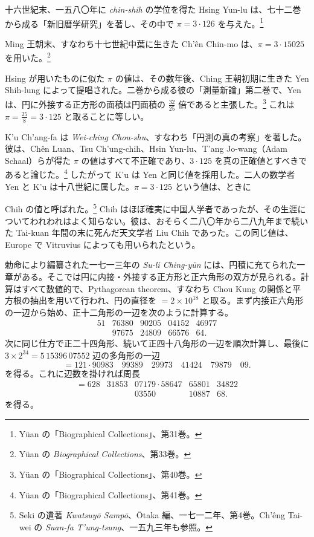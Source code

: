 \documentclass[11pt]{article}
\newcommand{\scanpage}[2]{\clearpage\setcounter{footnote}{0}\noindent{\footnotesize\color{gray}PDF #1 頁 · #2}\par\medskip}
\newcommand{\scanfooter}{}
\begin{document}
十六世紀末、一五八〇年に \emph{chin-shih} の学位を得た Hsing Yun-lu は、七十二巻から成る「新旧暦学研究」を著し、その中で $\pi=3\cdot126$ を与えた。\footnote{Yüan の「Biographical Collections」、第31巻。}

Ming 王朝末、すなわち十七世紀中葉に生きた Ch'ên Chin-mo は、$\pi=3\cdot15025$ を用いた。\footnote{Yüan の \emph{Biographical Collections}、第33巻。}

Hsing が用いたものに似た $\pi$ の値は、その数年後、Ching 王朝初期に生きた Yen Shih-lung によって提唱された。二巻から成る彼の「測量新論」第二巻で、Yen は、円に外接する正方形の面積は円面積の $\frac{32}{25}$ 倍であると主張した。\footnote{Yüan の「Biographical Collections」、第40巻。} これは $\pi=\frac{25}{8}=3\cdot125$ と取ることに等しい。

K'u Ch'ang-fa は \emph{Wei-ching Chou-shu}、すなわち「円測の真の考察」を著した。彼は、Chên Luan、Tsu Ch'ung-chih、Hsin Yun-lu、T'ang Jo-wang（Adam Schaal）らが得た $\pi$ の値はすべて不正確であり、$3\cdot125$ を真の正確値とすべきであると論じた。\footnote{Yüan の「Biographical Collections」、第41巻。} したがって K'u は Yen と同じ値を採用した。二人の数学者 Yen と K'u は十八世紀に属した。$\pi=3\cdot125$ という値は、ときに
\scanfooter

\scanpage{0153}{第20章、印刷頁139}
Chih の値と呼ばれた。\footnote{Seki の遺著 \emph{Kwatsuyō Sampō}、Ōtaka 編、一七一二年、第4巻。Ch'êng Tai-wei の \emph{Suan-fa T'ung-tsung}、一五九三年も参照。} Chih はほぼ確実に中国人学者であったが、その生涯についてわれわれはよく知らない。彼は、おそらく二八〇年から二八九年まで続いた Tai-kuan 年間の末に死んだ天文学者 Liu Chih であった。この同じ値は、Europe で Vitruvius によっても用いられたという。

勅命により編纂された一七一三年の \emph{Su-li Ching-yün} には、円積に充てられた一章がある。そこでは円に内接・外接する正方形と正六角形の双方が見られる。計算はすべて数値的で、Pythagorean theorem、すなわち Chou Kung の関係と平方根の抽出を用いて行われ、円の直径を $=2\times10^{18}$ と取る。まず内接正六角形の一辺から始め、正十二角形の一辺を次のように計算する。
\[
\begin{array}{rrrrr}
51&76380&90205&04152&46977\\
&97675&24809&66576&64.
\end{array}
\]
次に同じ仕方で正二十四角形、続いて正四十八角形の一辺を順次計算し、最後に $3\times2^{34}=5\,15396\,07552$ 辺の多角形の一辺
\[
=121\cdot90983\quad 99389\quad 29973\quad 41424\quad 79879\quad 09.
\]
を得る。これに辺数を掛ければ周長
\[
\begin{array}{rrrrrr}
=628&31853&07179\cdot58647&65801&34822\\
&&03550&10887&68.
\end{array}
\]
を得る。
\end{document}
